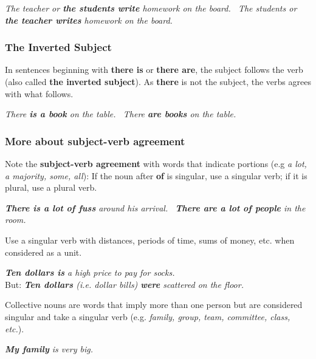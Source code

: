 \documentclass[hidelinks,10pt,a4paper]{article}
\begin{document}
\begin{center}
	\textit{The teacher or \textbf{the students write} homework on the board. \
	The students or \textbf{the teacher writes} homework on the board.}
\end{center}

\subsubsection{The Inverted Subject}

In sentences beginning with \textbf{there is} or \textbf{there are}, the subject follows the verb (also called \textbf{the inverted subject}). As \textbf{there} is not the subject, the verbs agrees with what follows.

\begin{center}
	\textit{There \textbf{is a book} on the table. \
	There \textbf{are books} on the table.}
\end{center}

\subsubsection{More about subject-verb agreement}

Note the \textbf{subject-verb agreement} with words that indicate portions (e.g \textit{a lot, a majority, some, all}): If the noun after \textbf{of} is singular, use a singular verb; if it is plural, use a plural verb.

\begin{center}
	\textit{ \textbf{There is a lot of fuss} around his arrival. \
	\textbf{There are a lot of people} in the room.}
\end{center}

Use a singular verb with distances, periods of time, sums of money, etc. when considered as a unit.

\begin{center}
	\textit{ \textbf{Ten dollars is} a high price to pay for socks.} \\
	But: \textit{ \textbf{Ten dollars} (i.e. dollar bills) \textbf{were} scattered on the floor. }
\end{center}

Collective nouns are words that imply more than one person but are considered singular and take a singular verb (e.g. \textit{family, group, team, committee, class, etc.}).
\begin{center}
	\textit{ \textbf{My family} is very big.}
\end{center}
\end{document}
